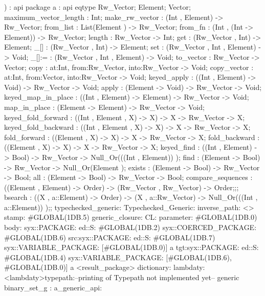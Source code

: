 )
:
api {   package a
          : api {
                eqtype Rw_Vector;
                Element;
                Vector;
                maximum_vector_length : Int;
                make_rw_vector : (Int , Element) -> Rw_Vector;
                from_list : List(Element ) -> Rw_Vector;
                from_fn : (Int , (Int -> Element)) -> Rw_Vector;
                length : Rw_Vector -> Int;
                get : (Rw_Vector , Int) -> Element;
                _[] : (Rw_Vector , Int) -> Element;
                set : (Rw_Vector , Int , Element) -> Void;
                _[]:= : (Rw_Vector , Int , Element) -> Void;
                to_vector : Rw_Vector -> Vector;
                copy : {at:Int, from:Rw_Vector, into:Rw_Vector} -> Void;
                copy_vector : {at:Int, from:Vector, into:Rw_Vector} -> Void;
                keyed_apply : ((Int , Element) -> Void) -> Rw_Vector -> Void;
                apply : (Element -> Void) -> Rw_Vector -> Void;
                keyed_map_in_place : ((Int , Element) -> Element) -> Rw_Vector -> Void;
                map_in_place : (Element -> Element) -> Rw_Vector -> Void;
                keyed_fold_forward : ((Int , Element , X) -> X) -> X -> Rw_Vector -> X;
                keyed_fold_backward : ((Int , Element , X) -> X) -> X -> Rw_Vector -> X;
                fold_forward : ((Element , X) -> X) -> X -> Rw_Vector -> X;
                fold_backward : ((Element , X) -> X) -> X -> Rw_Vector -> X;
                keyed_find : ((Int , Element) -> Bool) -> Rw_Vector -> Null_Or(((Int , Element)) );
                find : (Element -> Bool) -> Rw_Vector -> Null_Or(Element );
                exists : (Element -> Bool) -> Rw_Vector -> Bool;
                all : (Element -> Bool) -> Rw_Vector -> Bool;
                compare_sequences : ((Element , Element) -> Order) -> (Rw_Vector , Rw_Vector) -> Order;};;
    bsearch : ((X , a::Element) -> Order) -> (X , a::Rw_Vector) -> Null_Or(((Int , a::Element)) );};
typechecked_generic:
Typechecked_Generic:
inverse_path: <>
stamp: #GLOBAL(1DB.5)
generic_closure:
CL:
parameter: #GLOBAL(1DB.0)
body: syx::PACKAGE:
        ed::S: #GLOBAL(1DB.2)
            syx::COERCED_PACKAGE:
                #GLOBAL(1DB.6)
                 src:syx::PACKAGE:
                 ed::S: #GLOBAL(1DB.7) syx::VARIABLE_PACKAGE: [#GLOBAL(1DB.0)] a
                tgt:syx::PACKAGE:
                 ed::S: #GLOBAL(1DB.4) syx::VARIABLE_PACKAGE: [#GLOBAL(1DB.6), #GLOBAL(1DB.0)] a
         <result_package>
dictionary:
lambdaty:
  <lambdaty>typepath:--printing of Typepath not implemented yet--
generic binary_set_g
:
a_generic_api:
